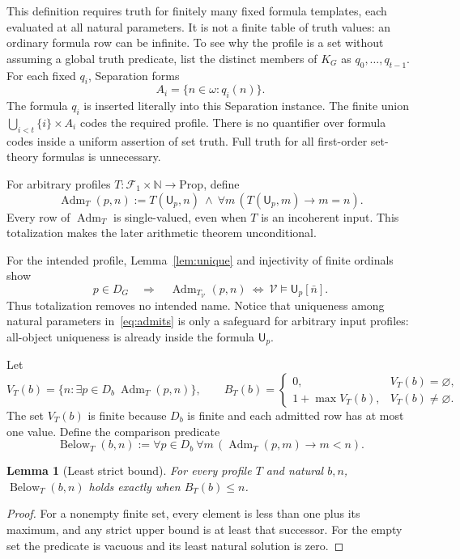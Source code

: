\documentclass[11pt]{article}
\newtheorem{lemma}[theorem]{Lemma}
\newcommand{\N}{\mathbb N}
\newcommand{\V}{\mathcal V}
\newcommand{\F}{\mathcal F}
\newcommand{\U}{\mathsf U}
\newcommand{\Adm}{\operatorname{Adm}}
\newcommand{\Below}{\operatorname{Below}}
\begin{document}
This definition requires truth for finitely many fixed formula templates,
each evaluated at all natural parameters. It is not a finite table of truth
values: an ordinary formula row can be infinite. To see why the profile is a
set without assuming a global truth predicate, list the distinct members of
$K_G$ as $q_0,\ldots,q_{t-1}$. For each fixed $q_i$, Separation forms
\[
          A_i=\{n\in\omega:q_i(n)\}.
\]
The formula $q_i$ is inserted literally into this Separation instance.
The finite union $\bigcup_{i<t}\{i\}\times A_i$ codes the required profile.
There is no quantifier over formula codes inside a uniform assertion of set
truth. Full truth for all first-order set-theory formulas is unnecessary.

For arbitrary profiles $T:\F_1\times\N\to\mathrm{Prop}$, define
\begin{equation}\label{eq:admits}
 \Adm_T(p,n):=T(\U_p,n)\ \wedge\
                   \forall m\,(T(\U_p,m)\to m=n).
\end{equation}
Every row of $\Adm_T$ is single-valued, even when $T$ is an incoherent input.
This totalization makes the later arithmetic theorem unconditional.

For the intended profile, Lemma~\ref{lem:unique} and injectivity of finite
ordinals show
\begin{equation}\label{eq:intended-admits}
 p\in D_G\quad\Longrightarrow\quad
 \Adm_{T_{\V}}(p,n)\ \Longleftrightarrow\
 \V\models\U_p[\bar n].
\end{equation}
Thus totalization removes no intended name. Notice that uniqueness among
natural parameters in~\eqref{eq:admits} is only a safeguard for arbitrary
input profiles: all-object uniqueness is already inside the formula $\U_p$.

Let
\[
 V_T(b)=\{n:\exists p\in D_b\ \Adm_T(p,n)\},\qquad
 B_T(b)=
 \begin{cases}
 0,&V_T(b)=\varnothing,\\
 1+\max V_T(b),&V_T(b)\ne\varnothing.
 \end{cases}
\]
The set $V_T(b)$ is finite because $D_b$ is finite and each admitted row has
at most one value. Define the comparison predicate
\begin{equation}\label{eq:below}
 \Below_T(b,n):=\forall p\in D_b\ \forall m\,
                             (\Adm_T(p,m)\to m<n).
\end{equation}

\begin{lemma}[Least strict bound]\label{lem:boundary}
For every profile $T$ and natural $b,n$,
$\Below_T(b,n)$ holds exactly when $B_T(b)\leq n$.
\end{lemma}
\begin{proof}
For a nonempty finite set, every element is less than one plus its maximum,
and any strict upper bound is at least that successor. For the empty set the
predicate is vacuous and its least natural solution is zero.
\end{proof}
\end{document}
